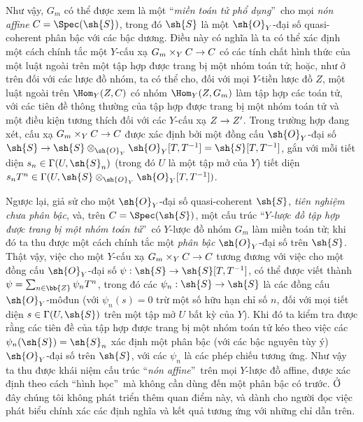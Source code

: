 \documentclass[oneside,10pt]{amsart}
\makeatletter
\newcommand{\ega@arrow}[2]{\mathchoice{#1}{#2}{#2}{#2}}
\renewcommand{\to}{\ega@arrow{\longrightarrow}{\rightarrow}}
\newcommand{\oldpage}[2][]{\marginnote{\normalfont\footnotesize\textbf{#1}~|~#2}\ignorespaces}
\makeatother
\begin{document}
\begin{remark}[8.3.9]
Như vậy, $G_m$ có thể được xem là một \textquotedblleft\emph{miền toán tử phổ dụng}\textquotedblright\ cho mọi \emph{nón affine} $C=\Spec(\sh{S})$, trong đó $\sh{S}$ là một $\sh{O}_Y$-đại số quasi-coherent phân bậc với các bậc dương.
Điều này có nghĩa là ta có thể xác định một cách chính tắc một $Y$-cấu xạ $G_m\times_Y C\to C$ có các tính chất hình thức của một luật ngoài trên một tập hợp được trang bị một nhóm toán tử;
hoặc, như ở trên đối với các lược đồ nhóm, ta có thể cho, đối với mọi $Y$-tiền lược đồ $Z$, một luật ngoài trên $\Hom_Y(Z,C)$ có nhóm $\Hom_Y(Z,G_m)$ làm tập hợp các toán tử, với các tiên đề thông thường của tập hợp được trang bị một nhóm toán tử và một điều kiện tương thích đối với các $Y$-cấu xạ $Z\to Z'$.
Trong trường hợp đang xét, cấu xạ $G_m\times_Y C\to C$ được xác định bởi một đồng cấu $\sh{O}_Y$-đại số $\sh{S} \to \sh{S}\otimes_{\sh{O}_Y}\sh{O}_Y[T,T^{-1}] = \sh{S}[T,T^{-1}]$, gắn với mỗi tiết diện $s_n\in\Gamma(U,\sh{S}_n)$ (trong đó $U$ là một tập mở của $Y$) tiết diện $s_n T^n\in\Gamma(U,\sh{S}\otimes_{\sh{O}_Y}\sh{O}_Y[T,T^{-1}])$.

Ngược lại, giả sử cho một $\sh{O}_Y$-đại số quasi-coherent $\sh{S}$, \emph{tiên nghiệm chưa phân bậc}, và, trên $C=\Spec(\sh{S})$, một cấu trúc \textquotedblleft\emph{$Y$-lược đồ tập hợp được trang bị một nhóm toán tử}\textquotedblright\ có $Y$-lược đồ nhóm $G_m$ làm miền toán tử;
khi đó ta thu được một cách chính tắc một \emph{phân bậc} $\sh{O}_Y$-đại số trên $\sh{S}$.
Thật vậy, việc cho một $Y$-cấu xạ $G_m\times_Y C\to C$ tương đương với việc cho một đồng cấu $\sh{O}_Y$-đại số $\psi:\sh{S}\to\sh{S}[T,T^{-1}]$, có thể được viết thành $\psi=\sum_{n\in\bb{Z}}\psi_n T^n$, trong đó các $\psi_n:\sh{S}\to\sh{S}$ là các đồng cấu $\sh{O}_Y$-môđun (với $\psi_n(s)=0$ trừ một số hữu hạn chỉ số $n$, đối với mọi tiết diện $s\in\Gamma(U,\sh{S})$ trên một tập mở $U$ bất kỳ của $Y$).
Khi đó ta kiểm tra được rằng các tiên đề của tập hợp được trang bị một nhóm toán tử kéo theo việc các $\psi_n(\sh{S})=\sh{S}_n$ xác định một phân bậc (với các bậc nguyên tùy ý) $\sh{O}_Y$-đại số trên $\sh{S}$, với các $\psi_n$ là các phép chiếu tương ứng.
Như vậy ta thu được khái niệm cấu trúc \textquotedblleft\emph{nón affine}\textquotedblright\ trên mọi $Y$-lược đồ affine, được xác định theo cách \textquotedblleft hình học\textquotedblright\ mà không cần dùng đến một phân bậc có trước.
\oldpage[II]{168}
Ở đây chúng tôi không phát triển thêm quan điểm này, và dành cho người đọc việc phát biểu chính xác các định nghĩa và kết quả tương ứng với những chỉ dẫn trên.
\end{remark}
\end{document}
